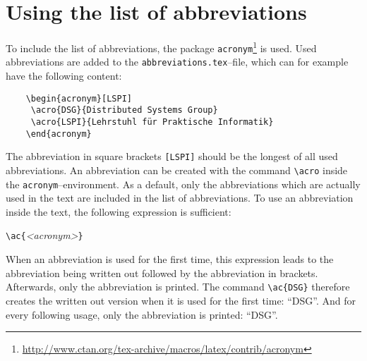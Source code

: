 %
\section{Using the list of abbreviations}
%
To include the list of abbreviations, the package \texttt{acronym}\footnote{\url{http://www.ctan.org/tex-archive/macros/latex/contrib/acronym}} is used.
Used abbreviations are added to the \texttt{abbreviations.tex}--file, which can for example have the following content:
%
\begin{verbatim}
	\begin{acronym}[LSPI]
	 \acro{DSG}{Distributed Systems Group}
	 \acro{LSPI}{Lehrstuhl für Praktische Informatik}
	\end{acronym}
\end{verbatim}
%
The abbreviation in square brackets \texttt{[LSPI]} should be the longest of all used abbreviations. 
An abbreviation can be created with the command \texttt{\textbackslash acro} inside the \texttt{acronym}--environment.
As a default, only the abbreviations which are actually used in the text are included in the list of abbreviations.
To use an abbreviation inside the text, the following expression is sufficient:

\texttt{\textbackslash ac\{}\textit{<acronym>}\texttt{\}}

When an abbreviation is used for the first time, this expression leads to the abbreviation being written out followed by the abbreviation in brackets.
Afterwards, only the abbreviation is printed.
The command \texttt{\textbackslash ac\{DSG\}} therefore creates the written out version when it is used for the first time: "`\ac{DSG}"'.
And for every following usage, only the abbreviation is printed: "`\ac{DSG}"'.